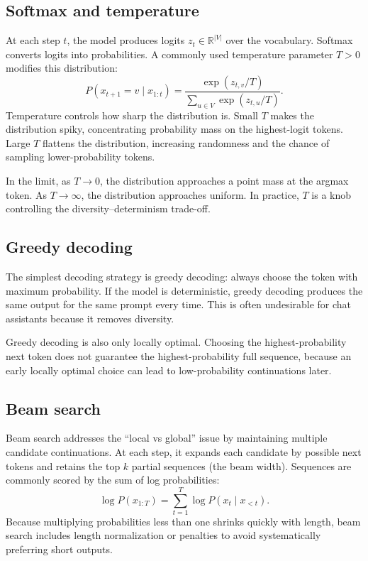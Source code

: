 \subsection{Softmax and temperature}
At each step \(t\), the model produces logits \(z_t \in \mathbb{R}^{|V|}\) over the vocabulary. Softmax converts logits into probabilities. A commonly used temperature parameter \(T>0\) modifies this distribution:
\[
P(x_{t+1}=v \mid x_{1:t}) = \frac{\exp(z_{t,v}/T)}{\sum_{u\in V}\exp(z_{t,u}/T)}.
\]
Temperature controls how sharp the distribution is. Small \(T\) makes the distribution spiky, concentrating probability mass on the highest-logit tokens. Large \(T\) flattens the distribution, increasing randomness and the chance of sampling lower-probability tokens.

In the limit, as \(T\to 0\), the distribution approaches a point mass at the argmax token. As \(T\to\infty\), the distribution approaches uniform. In practice, \(T\) is a knob controlling the diversity–determinism trade-off.

\subsection{Greedy decoding}
The simplest decoding strategy is greedy decoding: always choose the token with maximum probability. If the model is deterministic, greedy decoding produces the same output for the same prompt every time. This is often undesirable for chat assistants because it removes diversity.

Greedy decoding is also only locally optimal. Choosing the highest-probability next token does not guarantee the highest-probability full sequence, because an early locally optimal choice can lead to low-probability continuations later.

\subsection{Beam search}
Beam search addresses the “local vs global” issue by maintaining multiple candidate continuations. At each step, it expands each candidate by possible next tokens and retains the top \(k\) partial sequences (the beam width). Sequences are commonly scored by the sum of log probabilities:
\[
\log P(x_{1:T}) = \sum_{t=1}^T \log P(x_t\mid x_{<t}).
\]
Because multiplying probabilities less than one shrinks quickly with length, beam search includes length normalization or penalties to avoid systematically preferring short outputs.

